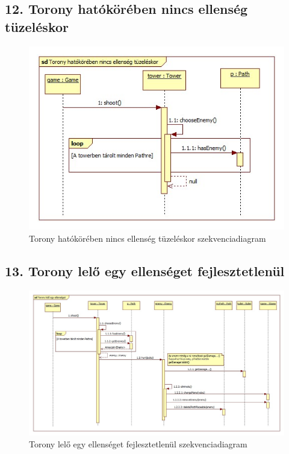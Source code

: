 \subsection{12. Torony hatókörében nincs ellenség tüzeléskor}
\begin{figure}[H]
\begin{center}
\includegraphics[width=17cm]{chapters/chapter05/images/sd_Torony_hatokoreben_nincs_ellenseg_tuzeleskor.jpg}
\caption{Torony hatókörében nincs ellenség tüzeléskor szekvenciadiagram}
\label{fig:sd_Torony_hatokoreben_nincs_ellenseg_tuzeleskor}
\end{center}
\end{figure}

\subsection{13. Torony lelő egy ellenséget fejlesztetlenül}
\begin{figure}[H]
\begin{center}
\includegraphics[width=17cm]{chapters/chapter05/images/sd_Torony_lelo_egy_ellenseget_fejlesztetlenul.jpg}
\caption{Torony lelő egy ellenséget fejlesztetlenül szekvenciadiagram}
\label{fig:sd_Torony_lelo_egy_ellenseget_fejlesztetlenul}
\end{center}
\end{figure}

